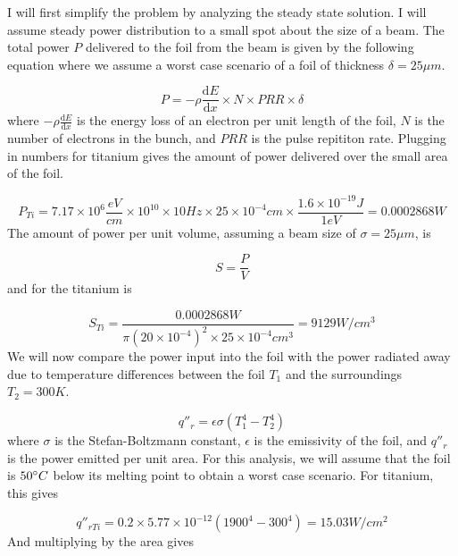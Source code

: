 \documentclass[12pt]{article}
\begin{document}
I will first simplify the problem by analyzing the steady state solution. I will assume steady power distribution to a small spot about the size of a beam. The total power $P$ delivered to the foil from the beam is given by the following equation where we assume a worst case scenario of a foil of thickness $\delta=25 \mu m$.

\begin{equation}
P=-\rho \frac{\mathrm{d} E}{\mathrm{d} x} \times N \times PRR \times \delta
\end{equation}
where $-\rho \frac{\mathrm{d} E}{\mathrm{d} x}$ is the energy loss of an electron per unit length of the foil, $N$ is the number of electrons in the bunch, and $PRR$ is the pulse repititon rate. Plugging in numbers for titanium gives the amount of power delivered over the small area of the foil.

\begin{equation}
P_{Ti}=7.17 \times 10^6 \frac{eV}{cm} \times 10^{10} \times 10 Hz \times 25 \times 10^{-4} cm \times \frac{1.6 \times 10^{-19} J}{1 eV}=0.0002868 W
\end{equation}
The amount of power per unit volume, assuming a beam size of $ \sigma = 25 \mu m$, is

\begin{equation}
S=\frac{P}{V}
\end{equation}
and for the titanium is

\begin{equation}
S_{Ti}=\frac{0.0002868 W}{\pi (20 \times 10^{-4})^2 \times 25 \times 10^{-4} cm^3}=9129 W/cm^3
\end{equation}
We will now compare the power input into the foil with the power radiated away due to temperature differences between the foil $T_1$ and the surroundings $T_2=300 K$.

\begin{equation}
q''_r=\epsilon \sigma (T_{1}^{4}-T_{2}^{4})
\end{equation}
where $\sigma$ is the Stefan-Boltzmann constant, $\epsilon$ is the emissivity of the foil, and $q''_r$ is the power emitted per unit area. For this analysis, we will assume that the foil is $50 \degree C$ below its melting point to obtain a worst case scenario. For titanium, this gives

\begin{equation}
q''_{r Ti}=0.2 \times 5.77 \times 10^{-12} (1900^{4}-300^{4})=15.03 W/cm^2
\end{equation}
And multiplying by the area gives
\end{document}
